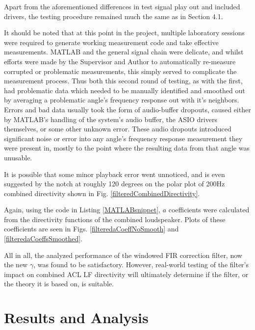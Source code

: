 \documentclass{report}
\begin{document}
            Apart from the aforementioned differences in test signal play out and included drivers, the testing procedure remained much the same as in Section 4.1.

            It should be noted that at this point in the project, multiple laboratory sessions were required to generate working measurement code and take effective measurements. 
            MATLAB and the general signal chain were delicate, and whilst efforts were made by the Supervisor and Author to automatically re-measure corrupted or problematic measurements, this simply served to complicate the measurement process.
            Thus both this second round of testing, as with the first, had problematic data which needed to be manually identified and smoothed out by averaging a problematic angle's frequency response out with it's neighbors.
            Errors and bad data usually took the form of audio-buffer dropouts, caused either by MATLAB's handling of the system's audio buffer, the ASIO drivers themselves, or some other unknown error.
            These audio dropouts introduced significant noise or error into any angle's frequency response measurement they were present in, mostly to the point where the resulting data from that angle was unusable.
            
            It is possible that some minor playback error went unnoticed, and is even suggested by the notch at roughly 120 degrees on the polar plot of 200Hz combined directivity shown in Fig. \ref{filteredCombinedDirectivity}.
            
            Again, using the code in Listing \ref{MATLABsnippet}, $a$ coefficients were calculated from the directivity functions of the combined loudspeaker.
            Plots of these coefficients are seen in Figs. \ref{filteredaCoeffNoSmooth} and \ref{filteredaCoeffsSmoothed}.

            All in all, the analyzed performance of the windowed FIR correction filter, now the new $\gamma$, was found to be satisfactory.
            However, real-world testing of the filter's impact on combined ACL LF directivity will ultimately determine if the filter, or the theory it is based on, is suitable.

\chapter{Results and Analysis}
\end{document}
